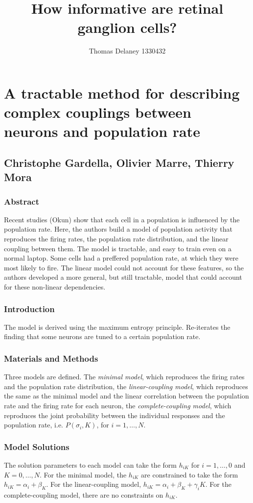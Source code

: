\documentclass[a4paper,12pt]{article}
\title{How informative are retinal ganglion cells?}
\author{Thomas Delaney 1330432}
\theoremstyle{definition}
\begin{document}
\section*{A tractable method for describing complex couplings between neurons and population rate}
\subsection*{Christophe Gardella, Olivier Marre, Thierry Mora}
\subsubsection*{Abstract}
	Recent studies (Okun) show that each cell in a population is influenced by the population rate. Here, the authors build a model of population activity that reproduces the firing rates, the population rate distribution, and the linear coupling between them. The model is tractable, and easy to train even on a normal laptop. Some cells had a preffered population rate, at which they were most likely to fire. The linear model could not account for these features, so the authors developed a more general, but still tractable, model that could account for these non-linear dependencies. 

\subsubsection*{Introduction}
	The model is derived using the maximum entropy principle. Re-iterates the finding that some neurons are tuned to a certain population rate.
	
\subsubsection*{Materials and Methods}
	Three models are defined. The \textit{minimal model}, which reproduces the firing rates and the population rate distribution, the \textit{linear-coupling model}, which reproduces the same as the minimal model and the linear correlation between the population rate and the firing rate for each neuron, the \textit{complete-coupling model}, which reproduces the joint probability between the individual responses and the population rate, i.e. $P(\sigma_i, K)$, for $i = 1, \dots, N$. 

\subsubsection*{Model Solutions}
	The solution parameters to each model can take the form $h_{iK}$ for $i = 1, \dots, 0$ and $K = 0, \dots, N$. For the minimal model, the $h_{iK}$ are constrained to take the form $h_{iK} = \alpha_i + \beta_K$. For the linear-coupling model, $h_{iK} = \alpha_i + \beta_K + \gamma_i K$. For the complete-coupling model, there are no constraints on $h_{iK}$.
	
\end{document}
